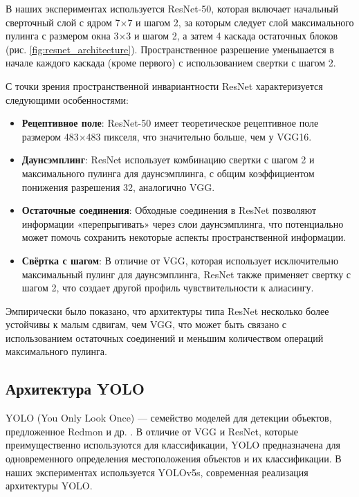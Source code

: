 В наших экспериментах используется ResNet-50, которая включает начальный сверточный слой с ядром 7×7 и шагом 2, за которым следует слой максимального пулинга с размером окна 3×3 и шагом 2, а затем 4 каскада остаточных блоков (рис. \ref{fig:resnet_architecture}). Пространственное разрешение уменьшается в начале каждого каскада (кроме первого) с использованием свертки с шагом 2.

С точки зрения пространственной инвариантности ResNet характеризуется следующими особенностями:

\begin{itemize}
    \item \textbf{Рецептивное поле}: ResNet-50 имеет теоретическое рецептивное поле размером 483×483 пикселя, что значительно больше, чем у VGG16.
    
    \item \textbf{Даунсэмплинг}: ResNet использует комбинацию свертки с шагом 2 и максимального пулинга для даунсэмплинга, с общим коэффициентом понижения разрешения 32, аналогично VGG.
    
    \item \textbf{Остаточные соединения}: Обходные соединения в ResNet позволяют информации «перепрыгивать» через слои даунсэмплинга, что потенциально может помочь сохранить некоторые аспекты пространственной информации.
    
    \item \textbf{Свёртка с шагом}: В отличие от VGG, которая использует исключительно максимальный пулинг для даунсэмплинга, ResNet также применяет свертку с шагом 2, что создает другой профиль чувствительности к алиасингу.
\end{itemize}

Эмпирически было показано, что архитектуры типа ResNet несколько более устойчивы к малым сдвигам, чем VGG, что может быть связано с использованием остаточных соединений и меньшим количеством операций максимального пулинга.

\subsection{Архитектура YOLO}
\label{theory:architectures:yolo}

YOLO (You Only Look Once) — семейство моделей для детекции объектов, предложенное Redmon и др. \cite{Redmon2016}. В отличие от VGG и ResNet, которые преимущественно используются для классификации, YOLO предназначена для одновременного определения местоположения объектов и их классификации. В наших экспериментах используется YOLOv5s, современная реализация архитектуры YOLO.

